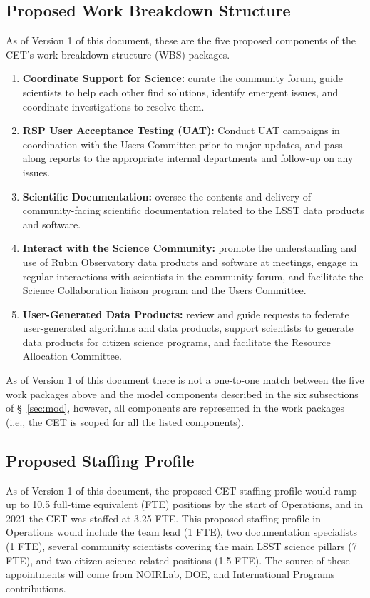 \documentclass[DM,lsstdraft,toc]{lsstdoc}
\begin{document}
\subsection{Proposed Work Breakdown Structure}\label{ssec:comp_wbs}

As of Version 1 of this document, these are the five proposed components of the CET's work breakdown structure (WBS) packages.

\begin{enumerate}
\item \textbf{Coordinate Support for Science:} curate the community forum, guide scientists to help each other find solutions, identify emergent issues, and coordinate investigations to resolve them.
\item \textbf{RSP User Acceptance Testing (UAT):} Conduct UAT campaigns in coordination with the Users Committee prior to major updates, and pass along reports to the appropriate internal departments and follow-up on any issues.
\item \textbf{Scientific Documentation:} oversee the contents and delivery of community-facing scientific documentation related to the LSST data products and software. 
\item \textbf{Interact with the Science Community:} promote the understanding and use of Rubin Observatory data products and software at meetings, engage in regular interactions with scientists in the community forum, and facilitate the Science Collaboration liaison program and the Users Committee.
\item \textbf{User-Generated Data Products:} review and guide requests to federate user-generated algorithms and data products, support scientists to generate data products for citizen science programs, and facilitate the Resource Allocation Committee.
\end{enumerate}

As of Version 1 of this document there is not a one-to-one match between the five work packages above and the model components described in the six subsections of \S~\ref{sec:mod}, however, all components are represented in the work packages (i.e., the CET is scoped for all the listed components).


\subsection{Proposed Staffing Profile}\label{ssec:comp_staff}

As of Version 1 of this document, the proposed CET staffing profile would ramp up to 10.5 full-time equivalent (FTE) positions by the start of Operations, and in 2021 the CET was staffed at 3.25 FTE. 
This proposed staffing profile in Operations would include the team lead (1 FTE), two documentation specialists (1 FTE), several community scientists covering the main LSST science pillars (7 FTE), and two citizen-science related positions (1.5 FTE). 
The source of these appointments will come from NOIRLab, DOE, and International Programs contributions.
\end{document}
